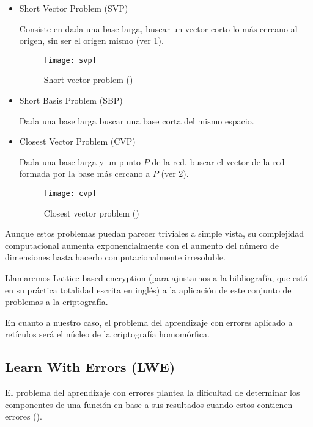 \begin{itemize}
  \item Short Vector Problem (SVP)

  Consiste en dada una base larga, buscar un vector corto lo más cercano al origen, sin ser el origen mismo (ver \ref{fig:svp}).

  \begin{figure}[h]
    \caption{Short vector problem (\cite{wikipedia_contributors._lattice_2019})}
    \label{fig:svp}
    \texttt{[image: svp]}
  \end{figure}

  \item Short Basis Problem (SBP)

  Dada una base larga buscar una base corta del mismo espacio.

  \item Closest Vector Problem (CVP)

  Dada una base larga y un punto $P$ de la red, buscar el vector de la red formada por la base más cercano a $P$ (ver \ref{fig:cvp}).

  \begin{figure}[h]
    \caption{Closest vector problem (\cite{wikipedia_contributors._lattice_2019})}
    \label{fig:cvp}
    \texttt{[image: cvp]}
  \end{figure}


\end{itemize}

Aunque estos problemas puedan parecer triviales a simple vista, su complejidad computacional aumenta exponencialmente con el aumento del número de dimensiones hasta hacerlo computacionalmente irresoluble.

Llamaremos Lattice-based encryption (para ajustarnos a la bibliografía, que está en su práctica totalidad escrita en inglés) a la aplicación de este conjunto de problemas a la criptografía.

En cuanto a nuestro caso, el problema del aprendizaje con errores aplicado a retículos será el núcleo de la criptografía homomórfica.

\subsection{Learn With Errors (LWE)}

El problema del aprendizaje con errores plantea la dificultad de determinar los componentes de una función en base a sus resultados cuando estos contienen errores (\cite{apon_intro_nodate}).

